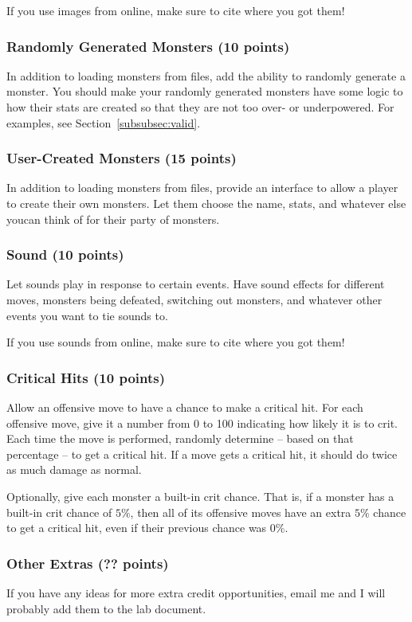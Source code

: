 \documentclass[11pt]{cselabheader}
\begin{document}
If you use images from online, make sure to cite where you got them!

\subsubsection{Randomly Generated Monsters (10 points)}
In addition to loading monsters from files, add the ability to randomly
generate a monster. You should make your randomly generated monsters have
some logic to how their stats are created so that they are not too over-
or underpowered. For examples, see Section~\ref{subsubsec:valid}.

\subsubsection{User-Created Monsters (15 points)}
In addition to loading monsters from files,
provide an interface to allow a player to create their own monsters. Let
them choose the name, stats, and whatever else youcan think of for their
party of monsters.

\subsubsection{Sound (10 points)}
Let sounds play in response to certain events. Have sound effects for
different moves, monsters being defeated, switching out monsters, and
whatever other events you want to tie sounds to.

If you use sounds from online, make sure to cite where you got them!

\subsubsection{Critical Hits (10 points)}
Allow an offensive move to have a chance to make a critical hit. For
each offensive move, give it a number from 0 to 100 indicating how
likely it is to crit. Each time the move is performed, randomly
determine -- based on that percentage -- to get a critical hit. If a
move gets a critical hit, it should do twice as much damage as normal.

Optionally, give each monster a built-in crit chance. That is, if a monster
has a built-in crit chance of $5\%$, then all of its offensive moves have
an extra $5\%$ chance to get a critical hit, even if their previous chance
was 0\%.

\subsubsection{Other Extras (?? points)}
If you have any ideas for more extra credit opportunities, email me and I
will probably add them to the lab document.
\end{document}
